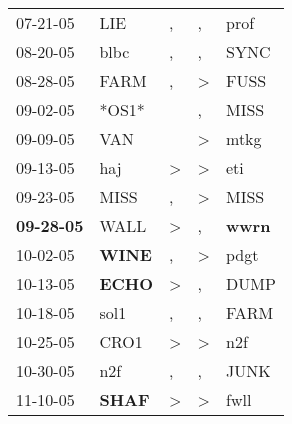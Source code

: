 \begin{supertabular}{p{0.07\textwidth}p{0.06\textwidth}p{0.02\textwidth}p{0.02\textwidth}p{0.06\textwidth}}
          07-21-05\textsuperscript{} &            LIE\textsuperscript{} &                , &                , &           prof\textsuperscript{} \\
          08-20-05\textsuperscript{} &           blbc\textsuperscript{} &                , &                , &           SYNC\textsuperscript{} \\
          08-28-05\textsuperscript{} &           FARM\textsuperscript{} &                , &     \textgreater &           FUSS\textsuperscript{} \\
          09-02-05\textsuperscript{} &                            *OS1* &                  &                , &           MISS\textsuperscript{} \\
          09-09-05\textsuperscript{} &            VAN\textsuperscript{} &                  &     \textgreater &           mtkg\textsuperscript{} \\
          09-13-05\textsuperscript{} &            haj\textsuperscript{} &     \textgreater &     \textgreater &            eti\textsuperscript{} \\
          09-23-05\textsuperscript{} &           MISS\textsuperscript{} &                , &     \textgreater &           MISS\textsuperscript{} \\
 \textbf{09-28-05\textsuperscript{}} &           WALL\textsuperscript{} &     \textgreater &                , &  \textbf{wwrn\textsuperscript{}} \\
          10-02-05\textsuperscript{} &  \textbf{WINE\textsuperscript{}} &                , &     \textgreater &           pdgt\textsuperscript{} \\
          10-13-05\textsuperscript{} &  \textbf{ECHO\textsuperscript{}} &     \textgreater &                , &           DUMP\textsuperscript{} \\
          10-18-05\textsuperscript{} &           sol1\textsuperscript{} &                , &                , &           FARM\textsuperscript{} \\
          10-25-05\textsuperscript{} &           CRO1\textsuperscript{} &     \textgreater &     \textgreater &            n2f\textsuperscript{} \\
          10-30-05\textsuperscript{} &            n2f\textsuperscript{} &                , &                , &           JUNK\textsuperscript{} \\
          11-10-05\textsuperscript{} &  \textbf{SHAF\textsuperscript{}} &     \textgreater &     \textgreater &           fwll\textsuperscript{} \\

\end{supertabular}
